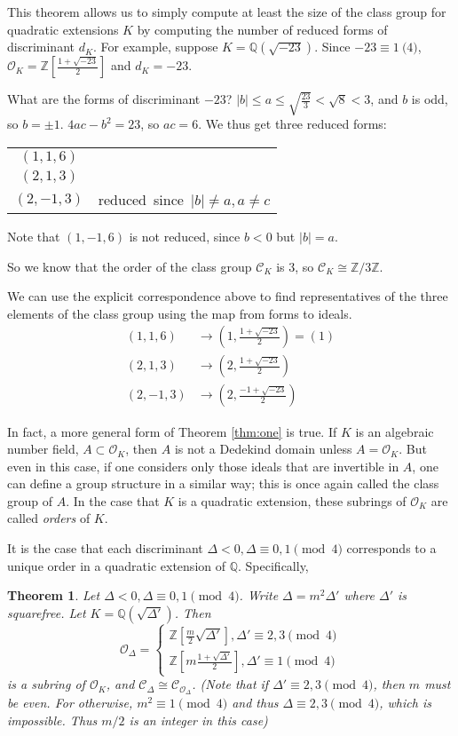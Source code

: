 \documentclass[12pt]{article}
\newcommand{\Ints}{\mathbb{Z}}
\newcommand{\Rats}{\mathbb{Q}}
\newcommand{\Alg}{\mathcal{O}}
\newtheorem{thm}{Theorem}
\theoremstyle{definition}
\begin{document}
This theorem allows us to simply compute at least the size of the class group for quadratic extensions $K$ by computing the number of reduced forms of discriminant $d_K$. For example, suppose $K=\Rats(\sqrt{-23})$. Since $-23\equiv 1\pod 4$, $\Alg_K=\Ints[\frac{1+\sqrt{-23}}{2}]$ and $d_K=-23$.

What are the forms of discriminant $-23$? $\lvert b\rvert\leq a\leq \sqrt{\frac{23}{3}}<\sqrt{8}<3$, and $b$ is odd, so $b=\pm 1$. $4ac-b^2=23$, so $ac=6$. We thus get three reduced forms:
\begin{center}
\begin{tabular}{c l}
$(1,1,6)$&\\
$(2,1,3)$&\\
$(2,-1,3)$&\mbox{\small reduced since $\lvert b\rvert\neq a, a\neq c$}
\end{tabular}
\end{center}
Note that $(1,-1,6)$ is not reduced, since $b<0$ but $\lvert b\rvert=a$.

So we know that the order of the class group $\mathcal{C}_K$ is $3$, so $\mathcal{C}_K\cong \Ints/3\Ints$.

We can use the explicit correspondence above to find representatives of the three elements of the class group using the map from forms to ideals.
\begin{align*}
(1,1,6)&\rightarrow \left(1,\frac{1+\sqrt{-23}}{2}\right)=(1)\\
(2,1,3)&\rightarrow \left(2,\frac{1+\sqrt{-23}}{2}\right)\\
(2,-1,3)&\rightarrow \left(2,\frac{-1+\sqrt{-23}}{2}\right)
\end{align*}

In fact, a more general form of Theorem \ref{thm:one} is true. If $K$ is an algebraic number field, $A\subset \Alg_K$, then $A$ is not a Dedekind domain unless $A=\Alg_K$. But even in this case, if one considers only those ideals that are invertible in $A$, one can define a group structure in a similar way; this is once again called the class group of $A$. In the case that $K$ is a quadratic extension, these subrings of $\Alg_K$ are called \emph{orders} of $K$.

It is the case that each discriminant $\Delta<0, \Delta\equiv 0,1\pmod 4$ corresponds to a unique order in a quadratic extension of $\Rats$. Specifically,
\begin{thm} Let $\Delta<0, \Delta\equiv 0,1\pmod 4$. Write $\Delta=m^2\Delta'$ where $\Delta'$ is squarefree. Let $K=\Rats(\sqrt{\Delta'})$. Then
\[
\Alg_{\Delta}=\begin{cases}\Ints\left[\frac{m}{2}\sqrt{\Delta'}\right], \Delta'\equiv 2,3\pmod 4\\
\Ints\left[m\frac{1+\sqrt{\Delta'}}{2}\right], \Delta'\equiv 1\pmod 4
\end{cases}\]
is a subring of $\Alg_K$, and $\mathcal{C}_{\Delta}\cong \mathcal{C}_{\Alg_{\Delta}}$.
(Note that if $\Delta'\equiv 2,3\pmod 4$, then $m$ must be even. For otherwise, $m^2\equiv 1\pmod 4$ and thus $\Delta\equiv 2,3\pmod 4$, which is impossible. Thus $m/2$ is an integer in this case)
\end{thm}
\end{document}
